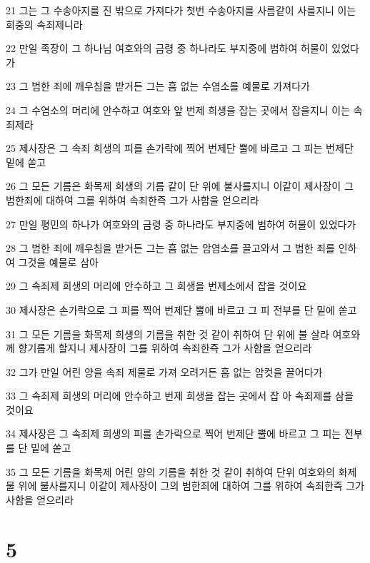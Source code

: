 \par 21 그는 그 수송아지를 진 밖으로 가져다가 첫번 수송아지를 사름같이 사를지니 이는 회중의 속죄제니라
\par 22 만일 족장이 그 하나님 여호와의 금령 중 하나라도 부지중에 범하여 허물이 있었다가
\par 23 그 범한 죄에 깨우침을 받거든 그는 흠 없는 수염소를 예물로 가져다가
\par 24 그 수염소의 머리에 안수하고 여호와 앞 번제 희생을 잡는 곳에서 잡을지니 이는 속죄제라
\par 25 제사장은 그 속죄 희생의 피를 손가락에 찍어 번제단 뿔에 바르고 그 피는 번제단 밑에 쏟고
\par 26 그 모든 기름은 화목제 희생의 기름 같이 단 위에 불사를지니 이같이 제사장이 그 범한죄에 대하여 그를 위하여 속죄한즉 그가 사함을 얻으리라
\par 27 만일 평민의 하나가 여호와의 금령 중 하나라도 부지중에 범하여 허물이 있었다가
\par 28 그 범한 죄에 깨우침을 받거든 그는 흠 없는 암염소를 끌고와서 그 범한 죄를 인하여 그것을 예물로 삼아
\par 29 그 속죄제 희생의 머리에 안수하고 그 희생을 번제소에서 잡을 것이요
\par 30 제사장은 손가락으로 그 피를 찍어 번제단 뿔에 바르고 그 피 전부를 단 밑에 쏟고
\par 31 그 모든 기름을 화목제 희생의 기름을 취한 것 같이 취하여 단 위에 불 살라 여호와께 향기롭게 할지니 제사장이 그를 위하여 속죄한즉 그가 사함을 얻으리라
\par 32 그가 만일 어린 양을 속죄 제물로 가져 오려거든 흠 없는 암컷을 끌어다가
\par 33 그 속죄제 희생의 머리에 안수하고 번제 희생을 잡는 곳에서 잡 아 속죄제를 삼을 것이요
\par 34 제사장은 그 속죄제 희생의 피를 손가락으로 찍어 번제단 뿔에 바르고 그 피는 전부를 단 밑에 쏟고
\par 35 그 모든 기름을 화목제 어린 양의 기름을 취한 것 같이 취하여 단위 여호와의 화제물 위에 불사를지니 이같이 제사장이 그의 범한죄에 대하여 그를 위하여 속죄한즉 그가 사함을 얻으리라

\chapter{5}

